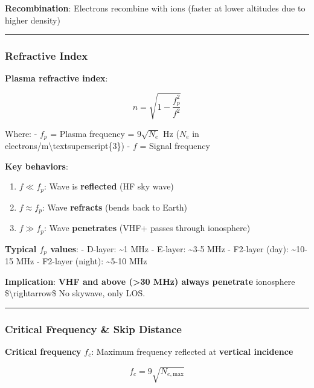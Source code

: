 \textbf{Recombination}: Electrons recombine with ions (faster at lower
altitudes due to higher density)

\begin{center}\rule{0.5\linewidth}{0.5pt}\end{center}

\subsubsection{Refractive Index}\label{refractive-index}

\textbf{Plasma refractive index}:

\[
n = \sqrt{1 - \frac{f_p^2}{f^2}}
\]

Where: - \(f_p\) = Plasma frequency = \(9\sqrt{N_e}\) Hz (\(N_e\) in
electrons/m\textbackslash textsuperscript\{3\}) - \(f\) = Signal
frequency

\textbf{Key behaviors}:

\begin{enumerate}
\def\labelenumi{\arabic{enumi}.}
\tightlist
\item
  \textbf{\(f \ll f_p\)}: Wave is \textbf{reflected} (HF sky wave)
\item
  \textbf{\(f \approx f_p\)}: Wave \textbf{refracts} (bends back to
  Earth)
\item
  \textbf{\(f \gg f_p\)}: Wave \textbf{penetrates} (VHF+ passes through
  ionosphere)
\end{enumerate}

\textbf{Typical \(f_p\) values}: - D-layer: \textasciitilde1 MHz -
E-layer: \textasciitilde3-5 MHz - F2-layer (day): \textasciitilde10-15
MHz - F2-layer (night): \textasciitilde5-10 MHz

\textbf{Implication}: \textbf{VHF and above (\textgreater30 MHz) always
penetrate} ionosphere \$\textbackslash rightarrow\$ No skywave, only
LOS.

\begin{center}\rule{0.5\linewidth}{0.5pt}\end{center}

\subsubsection{Critical Frequency \& Skip
Distance}\label{critical-frequency-skip-distance}

\textbf{Critical frequency} \(f_c\): Maximum frequency reflected at
\textbf{vertical incidence}

\[
f_c = 9\sqrt{N_{e,\text{max}}}
\]

